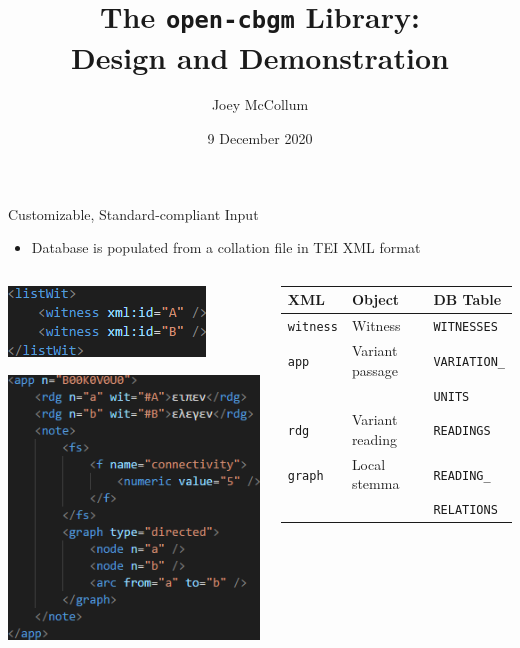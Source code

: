 \documentclass[10pt]{beamer}
\title{The \texttt{open-cbgm} Library:\\Design and Demonstration}
\author{Joey McCollum\inst{*}}
\institute{\inst{*}Virginia Polytechnic Institute and State University}
\date{9 December 2020}
\begin{document}
	\begin{frame}
		\titlepage
	\end{frame}
	\begin{frame}{Customizable, Standard-compliant Input}
		\begin{itemize}
			\item Database is populated from a collation file in TEI XML format
		\end{itemize}
		\begin{columns}
			\begin{column}{0.4\textwidth}
				\includegraphics[scale=0.6667]{../graphics/listwit-xml.png}
				
				\vspace{\baselineskip}
				
				\includegraphics[scale=0.6667]{../graphics/app-xml.png}
			\end{column}
			\begin{column}{0.55\textwidth}
				\footnotesize
				\begin{tabular}{l|l|l}
					XML & Object & DB Table\\
					\hline
					\hline
					\texttt{witness} & Witness & \texttt{WITNESSES}\\
					\hline
					\texttt{app} & Variant passage & \texttt{VARIATION\_}\\
					 & & \texttt{UNITS}\\
					 \hline
					\texttt{rdg} & Variant reading & \texttt{READINGS}\\
					\hline
					\texttt{graph} & Local stemma & \texttt{READING\_}\\
					 & & \texttt{RELATIONS}
				\end{tabular}
			\end{column}
		\end{columns}
	\end{frame}
\end{document}
